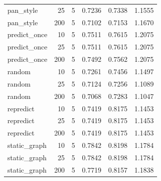 \begin{table}[t]
\begin{tabular}{lrrrrr}
pan\_style & 25 & 5 & 0.7236 & 0.7338 & 1.1555 \\
pan\_style & 200 & 5 & 0.7102 & 0.7153 & 1.1670 \\
predict\_once & 10 & 5 & 0.7511 & 0.7615 & 1.2075 \\
predict\_once & 25 & 5 & 0.7511 & 0.7615 & 1.2075 \\
predict\_once & 200 & 5 & 0.7492 & 0.7562 & 1.2075 \\
random & 10 & 5 & 0.7261 & 0.7456 & 1.1497 \\
random & 25 & 5 & 0.7124 & 0.7256 & 1.1089 \\
random & 200 & 5 & 0.7068 & 0.7283 & 1.1047 \\
repredict & 10 & 5 & 0.7419 & 0.8175 & 1.1453 \\
repredict & 25 & 5 & 0.7419 & 0.8175 & 1.1453 \\
repredict & 200 & 5 & 0.7419 & 0.8175 & 1.1453 \\
static\_graph & 10 & 5 & 0.7842 & 0.8198 & 1.1784 \\
static\_graph & 25 & 5 & 0.7842 & 0.8198 & 1.1784 \\
static\_graph & 200 & 5 & 0.7719 & 0.8157 & 1.1838 \\
\bottomrule
\end{tabular}
\end{table}
